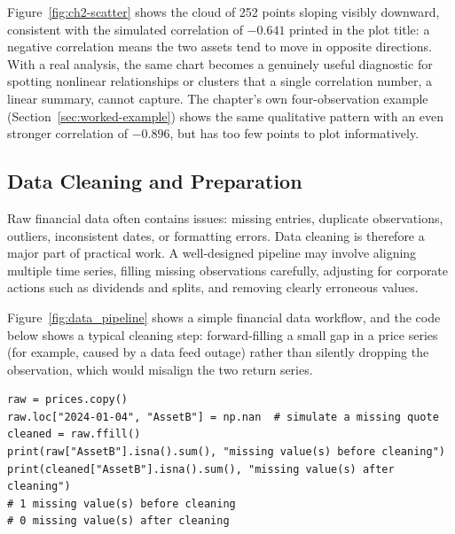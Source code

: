 \documentclass[../ai_in_finance]{subfiles}
\begin{document}
Figure~\ref{fig:ch2-scatter} shows the cloud of 252 points sloping visibly downward, consistent with the simulated correlation of $-0.641$ printed in the plot title: a negative correlation means the two assets tend to move in opposite directions. With a real analysis, the same chart becomes a genuinely useful diagnostic for spotting nonlinear relationships or clusters that a single correlation number, a linear summary, cannot capture. The chapter's own four-observation example (Section~\ref{sec:worked-example}) shows the same qualitative pattern with an even stronger correlation of $-0.896$, but has too few points to plot informatively.

\subsection{Data Cleaning and Preparation}
\label{sec:data-cleaning}

Raw financial data often contains issues: missing entries, duplicate observations, outliers, inconsistent dates, or formatting errors. Data cleaning is therefore a major part of practical work. A well-designed pipeline may involve aligning multiple time series, filling missing observations carefully, adjusting for corporate actions such as dividends and splits, and removing clearly erroneous values.

Figure~\ref{fig:data_pipeline} shows a simple financial data workflow, and the code below shows a typical cleaning step: forward-filling a small gap in a price series (for example, caused by a data feed outage) rather than silently dropping the observation, which would misalign the two return series.

\begin{verbatim}
raw = prices.copy()
raw.loc["2024-01-04", "AssetB"] = np.nan  # simulate a missing quote
cleaned = raw.ffill()
print(raw["AssetB"].isna().sum(), "missing value(s) before cleaning")
print(cleaned["AssetB"].isna().sum(), "missing value(s) after cleaning")
# 1 missing value(s) before cleaning
# 0 missing value(s) after cleaning
\end{verbatim}
\end{document}
